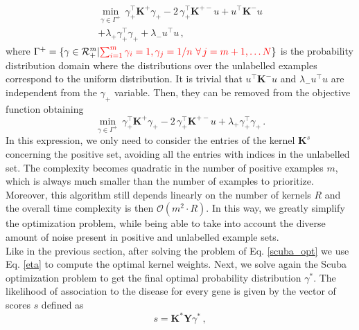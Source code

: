 \documentclass[twocolumn]{bmcart}%
\begin{document}
\begin{multline*}
	\min \limits_{\gamma \in \Gamma^{+}} \, \gamma_{+}^{\top} \textbf{K}^{+} \gamma_{+} - 2 \,\gamma_{+}^{\top} \textbf{K}^{+-} u +  u^{\top} \textbf{K}^{-} u \\+ \lambda_{+} \gamma_{+}^{\top} \gamma_{+} + \lambda_{-} u^{\top}u \, ,
\end{multline*}
where $\Gamma^{+} = \lbrace \gamma \in \mathcal{R}_+^m | \textcolor{red}{\sum_{i = 1}^{m} \gamma_i = 1, \gamma_j = 1/n \ \forall \, j = m+1, \dots N} \rbrace$ is the probability distribution domain where the distributions over the unlabelled examples correspond to the uniform distribution. It is trivial that $u^{\top} \textbf{K}^{-} u$ and $\lambda_{-} u^{\top}u$ are independent from the $\gamma_{+}$ variable. Then, they can be removed from the objective function obtaining
\begin{equation}\label{scuba_opt}
	\min \limits_{\gamma \in \Gamma^{+}} \, \gamma_{+}^{\top} \textbf{K}^{+} \gamma_{+} - 2 \, \gamma_{+}^{\top} \textbf{K}^{+-} u + \lambda_{+} \gamma_{+}^{\top} \gamma_{+} \, .
\end{equation}
In this expression, we only need to consider the entries of the kernel $\textbf{K}^{s}$ concerning the positive set, avoiding all the entries with indices in the unlabelled set. The complexity becomes quadratic in the number of positive examples $m$, which is always much smaller than the number of examples to prioritize. Moreover, this algorithm still depends linearly on the number of kernels $R$ and the overall time complexity is then $\mathcal{O}(m^2 \cdot R)$. In this way, we greatly simplify the optimization problem, while being able to take into account the diverse amount of noise present in positive and unlabelled example sets.\\
Like in the previous section, after solving the problem of Eq. \ref{scuba_opt} we use Eq. \ref{eta} to compute the optimal kernel weights. Next, we solve again the Scuba optimization problem to get the final optimal probability distribution $\gamma^{*}$. The likelihood of association to the disease for every gene is given by the vector of scores $s$ defined as
\begin{equation}\label{score_function}
	s = \textbf{K}^{*} \textbf{Y} \gamma^{*} \, ,
\end{equation}
\end{document}
